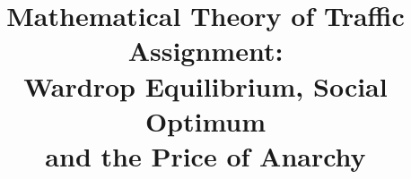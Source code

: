 \documentclass{book}
\title{Mathematical Theory of Traffic Assignment:\\
Wardrop Equilibrium, Social Optimum\\
and the Price of Anarchy}
\author{}
\newcommand\cvsnote{}
\renewcommand{\listoftodos}{}
\newcommand\cvsnote{}
\renewcommand{\listoftodos}{}
\newcommand\cvsnote{}
\theoremstyle{plain}
\theoremstyle{definition}
\theoremstyle{remark}
\begin{document}
\cvsnote
\pagestyle{fancy}

\newcommand\fileDate{2026}
\newcommand\fileName{traffic.tex}

\newcommand{\includefile}[2]{%
   \renewcommand{\fileName}{#1}
   \renewcommand{\fileDate}{#2}
   
}

\cleardoublepage
\tableofcontents
\listoftodos

\includefile{chapter01}{2026}   %
\includefile{chapter02}{2026}   %
\includefile{chapter03}{2026}   %
\includefile{chapter04}{2026}   %
\includefile{chapter05}{2026}   %
\includefile{chapter06}{2026}   %

\cleardoublepage
\thispagestyle{empty}

{}



{}
\printindex
\end{document}
